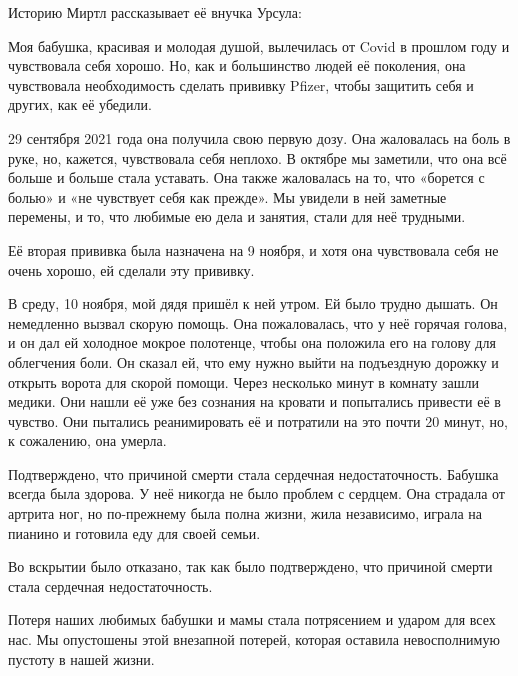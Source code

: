Историю Миртл рассказывает её внучка Урсула:

Моя бабушка, красивая и молодая душой, вылечилась от Covid в прошлом году и
чувствовала себя хорошо. Но, как и большинство людей её поколения, она
чувствовала необходимость сделать прививку Pfizer, чтобы защитить себя и других,
как её убедили.

29 сентября 2021 года она получила свою первую дозу. Она жаловалась на боль в
руке, но, кажется, чувствовала себя неплохо. В октябре мы заметили, что она всё
больше и больше стала уставать. Она также жаловалась на то, что «борется с
болью» и «не чувствует себя как прежде». Мы увидели в ней заметные перемены, и
то, что любимые ею дела и занятия, стали для неё трудными.

Её вторая прививка была назначена на 9 ноября, и хотя она чувствовала себя не
очень хорошо, ей сделали эту прививку.

В среду, 10 ноября, мой дядя пришёл к ней утром. Ей было трудно дышать. Он
немедленно вызвал скорую помощь. Она пожаловалась, что у неё горячая голова, и
он дал ей холодное мокрое полотенце, чтобы она положила его на голову для
облегчения боли. Он сказал ей, что ему нужно выйти на подъездную дорожку и
открыть ворота для скорой помощи. Через несколько минут в комнату зашли
медики. Они нашли её уже без сознания на кровати и попытались привести её в
чувство. Они пытались реанимировать её и потратили на это почти 20 минут, но, к
сожалению, она умерла.

Подтверждено, что причиной смерти стала сердечная недостаточность. Бабушка
всегда была здорова. У неё никогда не было проблем с сердцем. Она страдала от
артрита ног, но по-прежнему была полна жизни, жила независимо, играла на пианино
и готовила еду для своей семьи.

Во вскрытии было отказано, так как было подтверждено, что причиной смерти стала
сердечная недостаточность.

Потеря наших любимых бабушки и мамы стала потрясением и ударом для всех нас. Мы
опустошены этой внезапной потерей, которая оставила невосполнимую пустоту в
нашей жизни.
